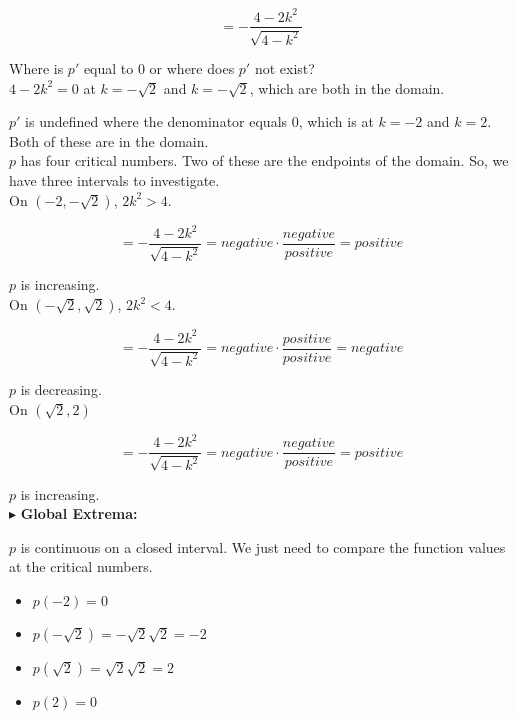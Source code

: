 \documentclass{ximera}
\begin{document}
\begin{example}
\[
= - \frac{4-2k^2}{\sqrt{4-k^2}} 
\]


Where is $p'$ equal to $0$ or where does $p'$ not exist? \\



$4-2k^2 = 0$ at $k = -\sqrt{2}$ and $k = -\sqrt{2}$, which are both in the domain.

$p'$ is undefined where the denominator equals $0$, which is at $k=-2$ and $k=2$.  Both of these are in the domain. \\



$p$ has four critical numbers.  Two of these are the endpoints of the domain. So, we have three intervals to investigate. \\



On $\left( -2, -\sqrt{2} \right)$, $2k^2 > 4$.


\[
= - \frac{4-2k^2}{\sqrt{4-k^2}} = negative \cdot \frac{negative}{positive} = positive
\]


$p$ is increasing.\\



On $\left( -\sqrt{2}, \sqrt{2} \right)$, $2k^2 < 4$.


\[
= - \frac{4-2k^2}{\sqrt{4-k^2}} = negative \cdot \frac{positive}{positive} = negative
\]


$p$ is decreasing.\\



On $\left( \sqrt{2}, 2 \right)$


\[
= - \frac{4-2k^2}{\sqrt{4-k^2}} = negative \cdot \frac{negative}{positive} = positive
\]


$p$ is increasing.\\



















$\blacktriangleright$ \textbf{\textcolor{blue!55!black}{Global Extrema:}}  


$p$ is continuous on a closed interval.  We just need to compare the function values at the critical numbers.


\begin{itemize}
  \item $p(-2) = 0$
  \item $p(-\sqrt{2}) = -\sqrt{2}\sqrt{2} = -2$
  \item $p(\sqrt{2}) = \sqrt{2}\sqrt{2} = 2$
  \item $p(2) = 0$
\end{itemize}



\end{example}
\end{document}

